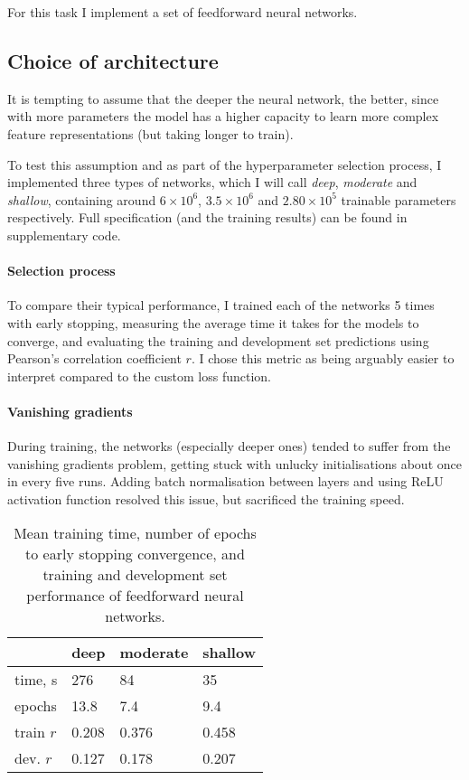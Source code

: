 \documentclass[10pt, twocolumn]{article}
\begin{document}
For this task I implement a set of feedforward neural networks.

\subsection{Choice of architecture}
It is tempting to assume that the deeper the neural network, the better, since with more parameters the model has a higher capacity to learn more complex feature representations (but taking longer to train). 

To test this assumption and as part of the hyperparameter selection process, I implemented three types of networks, which I will call \textit{deep}, \textit{moderate} and \textit{shallow}, containing around $6\times 10^6$, $3.5\times 10^6$ and $2.80 \times 10^5$ trainable parameters respectively. Full specification (and the training results) can be found in supplementary code. 

\paragraph{Selection process} To compare their typical performance, I trained each of the networks 5 times with early stopping, measuring the average time it takes for the models to converge, and evaluating the training and development set predictions using Pearson's correlation coefficient $r$. I chose this metric as being arguably easier to interpret compared to the custom loss function.

\paragraph{Vanishing gradients} During training, the networks (especially deeper ones) tended to suffer from the vanishing gradients problem, getting stuck with unlucky initialisations about once in every five runs. Adding batch normalisation between layers and using ReLU activation function resolved this issue, but sacrificed the training speed. 

\begin{table}[]
	\begin{tabularx}{\linewidth}{XXXX}
		\hline
				& \textbf{deep} & \textbf{moderate} & \textbf{shallow}\\ \hline
		time, s     & 276   & 84  & 35 \\
		epochs & 13.8 & 7.4 & 9.4 \\
		train $r$ & 0.208 & 0.376 & 0.458 \\
		dev. $r$ & 0.127 & 0.178 & 0.207
		\end{tabularx}
\caption{Mean training time, number of epochs to early stopping convergence, and training and development set performance of feedforward neural networks.}\label{g1}
\end{table}
\end{document}
